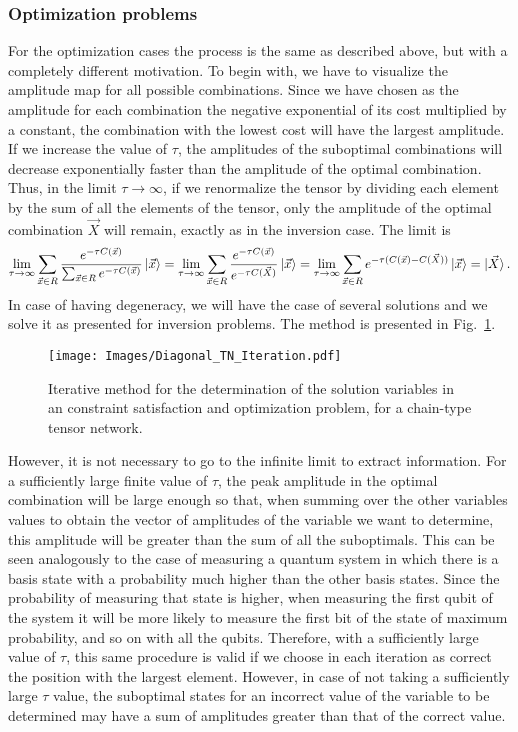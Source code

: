 \subsubsection{Optimization problems}
For the optimization cases the process is the same as described above, but with a completely different motivation. To begin with, we have to visualize the amplitude map for all possible combinations. Since we have chosen as the amplitude for each combination the negative exponential of its cost multiplied by a constant, the combination with the lowest cost will have the largest amplitude. If we increase the value of $\tau$, the amplitudes of the suboptimal combinations will decrease exponentially faster than the amplitude of the optimal combination. Thus, in the limit $\tau\rightarrow\infty$, if we renormalize the tensor by dividing each element by the sum of all the elements of the tensor, only the amplitude of the optimal combination $\vec{X}$ will remain, exactly as in the inversion case. The limit is
\begin{equation}
    \lim_{\tau\rightarrow\infty} \sum_{\vec{x}\in R}\frac{e^{-\tau C(\vec{x})}}{\sum_{\vec{x}\in R}e^{-\tau C(\vec{x})}}\ket{\vec{x}}=
    \lim_{\tau\rightarrow\infty} \sum_{\vec{x}\in R}\frac{e^{-\tau C(\vec{x})}}{e^{-\tau C(\vec{X})}}\ket{\vec{x}}=
    \lim_{\tau\rightarrow\infty}\sum_{\vec{x}\in R}e^{-\tau (C(\vec{x})-C(\vec{X}))}\ket{\vec{x}} = \ket{\vec{X}}.
\end{equation}
In case of having degeneracy, we will have the case of several solutions and we solve it as presented for inversion problems. The method is presented in Fig.~\ref{fig: Diagonal iteration}.
\begin{figure}
    \centering
    \texttt{[image: Images/Diagonal\_TN\_Iteration.pdf]}
    \caption{Iterative method for the determination of the solution variables in an constraint satisfaction and optimization problem, for a chain-type tensor network.}
    \label{fig: Diagonal iteration}
\end{figure}

However, it is not necessary to go to the infinite limit to extract information. For a sufficiently large finite value of $\tau$, the peak amplitude in the optimal combination will be large enough so that, when summing over the other variables values to obtain the vector of amplitudes of the variable we want to determine, this amplitude will be greater than the sum of all the suboptimals. This can be seen analogously to the case of measuring a quantum system in which there is a basis state with a probability much higher than the other basis states. Since the probability of measuring that state is higher, when measuring the first qubit of the system it will be more likely to measure the first bit of the state of maximum probability, and so on with all the qubits. Therefore, with a sufficiently large value of $\tau$, this same procedure is valid if we choose in each iteration as correct the position with the largest element. However, in case of not taking a sufficiently large $\tau$ value, the suboptimal states for an incorrect value of the variable to be determined may have a sum of amplitudes greater than that of the correct value.

